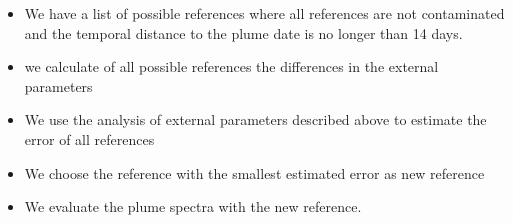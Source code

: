 \documentclass  [
  paper    = a4,
  BCOR     = 10mm,
  twoside,
  fontsize = 12pt,
  fleqn,
  toc      = bibnumbered,
  toc      = listofnumbered,
  numbers  = noendperiod,
  headings = normal,
  listof   = leveldown,
  version  = 3.03
]                                       {scrreprt}
\begin{document}
	\begin{itemize}
		\item We have a list of possible references where all references are not contaminated and the temporal distance to the plume date is no longer than 14 days.
		\item we calculate of all possible references the differences in the external parameters
		\item We use the analysis of external parameters described above to estimate the  error of all references
		\item We choose the reference with the smallest estimated  error as new reference
		\item We evaluate the plume spectra with the new reference.
	\end{itemize}
\end{document}
